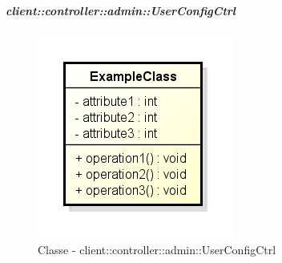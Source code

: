 		\subparagraph{client::controller::admin::UserConfigCtrl} %
		\label{subp:bdsm_app_client_controller_admin_userconfigctrl}
			\begin{figure}[htbp]
				\centering
				\centerline{\includegraphics[scale=0.7]{./images/client/classes/example_class.png}}
				\caption{Classe - client::controller::admin::UserConfigCtrl}
			\end{figure}
